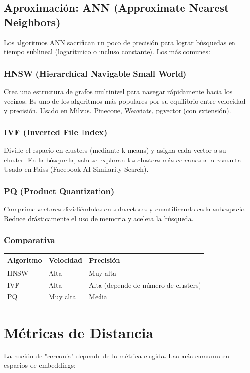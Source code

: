 \documentclass[12pt,a4paper,openany,oneside]{book}
\begin{document}
\section{Aproximación: ANN (Approximate Nearest Neighbors)}
Los algoritmos ANN sacrifican un poco de precisión para lograr búsquedas en tiempo sublineal (logarítmico o incluso constante). Los más comunes:

\subsection{HNSW (Hierarchical Navigable Small World)}
Crea una estructura de grafos multinivel para navegar rápidamente hacia los vecinos. Es uno de los algoritmos más populares por su equilibrio entre velocidad y precisión. Usado en Milvus, Pinecone, Weaviate, pgvector (con extensión).

\subsection{IVF (Inverted File Index)}
Divide el espacio en clusters (mediante k-means) y asigna cada vector a su cluster. En la búsqueda, solo se exploran los clusters más cercanos a la consulta. Usado en Faiss (Facebook AI Similarity Search).

\subsection{PQ (Product Quantization)}
Comprime vectores dividiéndolos en subvectores y cuantificando cada subespacio. Reduce drásticamente el uso de memoria y acelera la búsqueda.

\subsection{Comparativa}
\begin{center}
\begin{tabular}{|l|l|l|}
\hline
\textbf{Algoritmo} & \textbf{Velocidad} & \textbf{Precisión} \\ \hline
HNSW & Alta & Muy alta \\
IVF & Alta & Alta (depende de número de clusters) \\
PQ & Muy alta & Media \\ \hline
\end{tabular}
\end{center}

\chapter{Métricas de Distancia}
La noción de "cercanía" depende de la métrica elegida. Las más comunes en espacios de embeddings:
\end{document}
